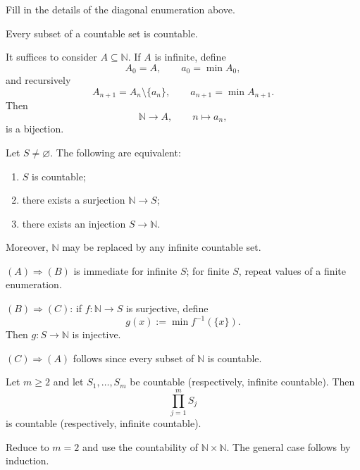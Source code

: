 \begin{exerciseenv}
Fill in the details of the diagonal enumeration above.
\end{exerciseenv}

\begin{theoremenv}
Every subset of a countable set is countable.
\end{theoremenv}

\begin{proofenv}
It suffices to consider $A\subseteq\mathbb N$. If $A$ is infinite, define
\[
    A_0=A,\qquad a_0=\min A_0,
\]
and recursively
\[
    A_{n+1}=A_n\setminus\{a_n\},
    \qquad
    a_{n+1}=\min A_{n+1}.
\]
Then
\[
    \mathbb N\to A,\qquad n\mapsto a_n,
\]
is a bijection.
\end{proofenv}

\begin{theoremenv}
Let $S\neq\varnothing$. The following are equivalent:
\begin{enumerate}[label=(\Alph*)]
    \item $S$ is countable;
    \item there exists a surjection $\mathbb N\to S$;
    \item there exists an injection $S\to\mathbb N$.
\end{enumerate}
Moreover, $\mathbb N$ may be replaced by any infinite countable set.
\end{theoremenv}

\begin{proofenv}
$(A)\Rightarrow(B)$ is immediate for infinite $S$; for finite $S$, repeat
values of a finite enumeration.

$(B)\Rightarrow(C)$: if $f:\mathbb N\to S$ is surjective, define
\[
    g(x):=\min f^{-1}(\{x\}).
\]
Then $g:S\to\mathbb N$ is injective.

$(C)\Rightarrow(A)$ follows since every subset of $\mathbb N$ is countable.
\end{proofenv}

\begin{theoremenv}
Let $m\ge2$ and let $S_1,\ldots,S_m$ be countable
(respectively, infinite countable). Then
\[
    \prod_{j=1}^{m}S_j
\]
is countable (respectively, infinite countable).
\end{theoremenv}

\begin{proofenv}
Reduce to $m=2$ and use the countability of $\mathbb N\times\mathbb N$.
The general case follows by induction.
\end{proofenv}

